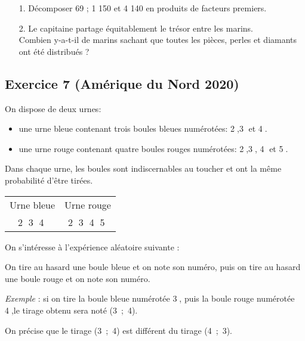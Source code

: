 \documentclass[14 pt]{extarticle}
\theoremstyle{plain}
\begin{document}
\begin{itemize}
\item[1.] Décomposer 69 ; 1 150 et 4 140 en produits de facteurs premiers.
\item[2.] Le capitaine partage équitablement le trésor entre les marins.\\
Combien y-a-t-il de marins sachant que toutes les pièces, perles et diamants ont été distribués ?
\end{itemize}




\subsection*{Exercice 7 (Amérique du Nord 2020)}



On dispose de deux urnes:

\begin{itemize}
\item une urne bleue contenant trois boules bleues numérotées: \textcircled{2},\textcircled{3} et \textcircled{4}.
\item une urne rouge contenant quatre boules rouges numérotées: \textcircled{2},\textcircled{3}, \textcircled{4} et \textcircled{5}.
\end{itemize}

Dans chaque urne, les boules sont indiscernables au toucher et ont la même probabilité d'être tirées.

\begin{center}
\begin{tabular}{|c| c|}\hline
Urne bleue &Urne rouge\\
\textcircled{2} \textcircled{3}  \textcircled{4}& \textcircled{2} \textcircled{3} \textcircled{4}  \textcircled{5}\\ \hline
\end{tabular}
\end{center}
\medskip

On s'intéresse à l'expérience aléatoire suivante :

\og On tire au hasard une boule bleue et on note son numéro, puis on tire au hasard une boule rouge et on note son numéro. \fg

\emph{Exemple} : si on tire la boule bleue numérotée \textcircled{3}, puis la boule rouge numérotée \textcircled{4},le tirage obtenu sera noté (3~;~4).

On précise que le tirage (3~;~4) est différent du tirage (4~;~3).
\end{document}
